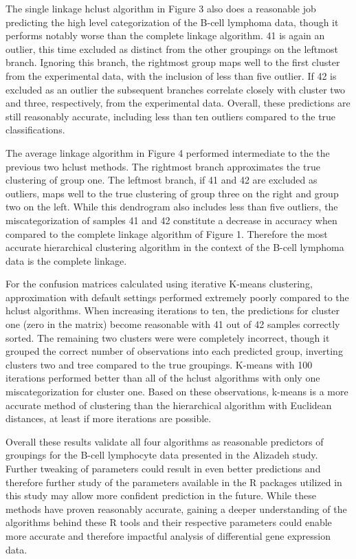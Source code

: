 \documentclass[11 pt,letterpaper,titlepage]{article} %
\begin{document}
    The single linkage hclust algorithm in Figure 3 also does a reasonable job predicting the high level categorization of the B-cell lymphoma data, though it performs notably worse than the complete linkage algorithm. 41 is again an outlier, this time excluded as distinct from the other groupings on the leftmost branch. Ignoring this branch, the rightmost group maps well to the first cluster from the experimental data, with the inclusion of less than five outlier. If 42 is excluded as an outlier the subsequent branches correlate closely with cluster two and three, respectively, from the experimental data. Overall, these predictions are still reasonably accurate, including less than ten outliers compared to the true classifications.

    The average linkage algorithm in Figure 4 performed intermediate to the the previous two hclust methods. The rightmost branch approximates the true clustering of group one. The leftmost branch, if 41 and 42 are excluded as outliers, maps well to the true clustering of group three on the right and group two on the left. While this dendrogram also includes less than five outliers, the miscategorization of samples 41 and 42 constitute a decrease in accuracy when compared to the complete linkage algorithm of Figure 1.
    Therefore the most accurate hierarchical clustering algorithm in the context of the B-cell lymphoma data is the complete linkage.


    For the confusion matrices calculated using iterative K-means clustering, approximation with default settings performed extremely poorly compared to the hclust algorithms. When increasing iterations to ten, the predictions for cluster one (zero in the matrix) become reasonable with 41 out of 42 samples correctly sorted. The remaining two clusters were were completely incorrect, though it grouped the correct number of observations into each predicted group, inverting clusters two and tree compared to the true groupings. K-means with 100 iterations performed better than all of the hclust algorithms with only one miscategorization for cluster one. Based on these observations, k-means is a more accurate method of clustering than the hierarchical algorithm with Euclidean distances, at least if more iterations are possible.

    Overall these results validate all four algorithms as reasonable predictors of groupings for the B-cell lymphocyte data presented in the Alizadeh study. Further tweaking of parameters could result in even better predictions and therefore further study of the parameters available in the R packages utilized in this study may allow more confident prediction in the future. While these methods have proven reasonably accurate, gaining a deeper understanding of the algorithms behind these R tools and their respective parameters could enable more accurate and therefore impactful analysis of differential gene expression data. 
\end{document}
